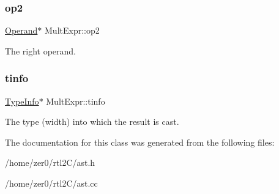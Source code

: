 \subsubsection{\texorpdfstring{op2}{op2}}
{\footnotesize\ttfamily \hyperlink{class_operand}{Operand}$\ast$ Mult\+Expr\+::op2\hspace{0.3cm}{\ttfamily [protected]}}

The right operand. \mbox{\label{class_mult_expr_ae2bc9b1b3fc5234d5d15411f82e5d882}} 
\subsubsection{\texorpdfstring{tinfo}{tinfo}}
{\footnotesize\ttfamily \hyperlink{class_type_info}{Type\+Info}$\ast$ Mult\+Expr\+::tinfo\hspace{0.3cm}{\ttfamily [protected]}}

The type (width) into which the result is cast. 

The documentation for this class was generated from the following files\+:\begin{DoxyCompactItemize}
\item 
/home/zer0/rtl2\+C/ast.\+h\item 
/home/zer0/rtl2\+C/ast.\+cc\end{DoxyCompactItemize}
